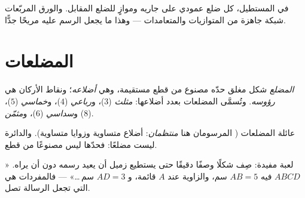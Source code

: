 \begin{example}\label{ex:g4:geometry:spot}
في المستطيل، كل ضلع عمودي على جاريه وموازٍ للضلع
المقابل. والورق المربّعات شبكة جاهزة من المتوازيات
والمتعامدات --- وهذا ما يجعل الرسم عليه مريحًا
جدًّا.
\end{example}

\section{المضلعات}

\begin{definition}[المضلع]\label{def:g4:geometry:polygon}
\emph{المضلع} شكل مغلق حدّه مصنوع من قطع
مستقيمة، وهي \emph{أضلاعه}؛ ونقاط الأركان هي
\emph{رؤوسه}. وتُسمَّى المضلعات بعدد أضلاعها:
\emph{مثلث} ($3$)، و\emph{رباعي} ($4$)،
و\emph{خماسي} ($5$)، و\emph{سداسي} ($6$)،
و\emph{مثمّن}
($8$).
\end{definition}

\begin{omfigure}

{\small عائلة المضلعات (  المرسومان هنا
\emph{منتظمان}: أضلاع متساوية وزوايا متساوية). والدائرة ليست
مضلعًا: فحدّها ليس مصنوعًا من قطع.}
\end{omfigure}

\begin{example}\label{ex:g4:geometry:describe}
لعبة مفيدة: صِف شكلًا وصفًا دقيقًا حتى يستطيع زميل أن
يعيد رسمه دون أن يراه. « $ABCD$ فيه
$AB = 5$ سم، والزاوية عند $A$ قائمة، و $AD = 3$ سم\,\dots» ---
فالمفردات هي التي تجعل الرسالة تصل.
\end{example}

